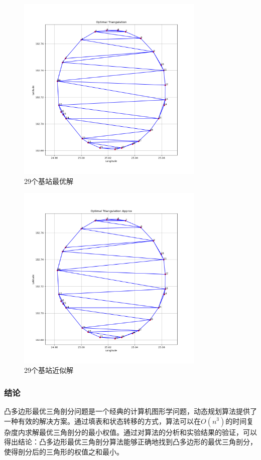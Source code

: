 \documentclass[lang=cn,11pt,a4paper]{elegantpaper}
\begin{document}
\begin{figure}[!htb]
\centering
\includegraphics[width=0.8\textwidth, height=0.4\textheight]{image/result3.png}
\caption{29个基站最优解}
\end{figure}

\begin{figure}[!htb]
\centering
\includegraphics[width=0.8\textwidth, height=0.4\textheight]{image/result4.png}
\caption{29个基站近似解}
\end{figure}

\clearpage

\subsubsection{结论}
凸多边形最优三角剖分问题是一个经典的计算机图形学问题，动态规划算法提供了一种有效的解决方案。通过填表和状态转移的方式，算法可以在$O(n^3)$的时间复杂度内求解最优三角剖分的最小权值。通过对算法的分析和实验结果的验证，可以得出结论：凸多边形最优三角剖分算法能够正确地找到凸多边形的最优三角剖分，使得剖分后的三角形的权值之和最小。
\end{document}
